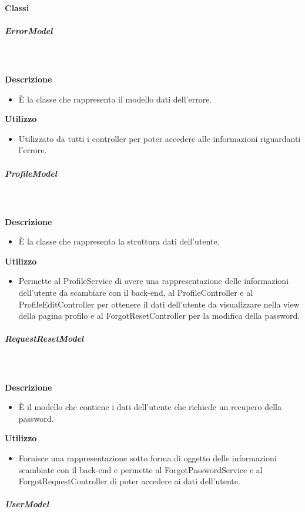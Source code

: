 		\paragraph{Classi}
			\subparagraph{ErrorModel}
				
				\textbf{\\ \\ Descrizione} 
					\begin{itemize}
						\item[] È la classe che rappresenta il modello dati dell'errore.
					\end{itemize}      
				\textbf{Utilizzo}  
					\begin{itemize}
						\item[] Utilizzato da tutti i controller per poter accedere alle informazioni riguardanti l'errore.
					\end{itemize}
			\subparagraph{ProfileModel}
				
				\textbf{\\ \\ Descrizione} 
					\begin{itemize}
						\item[] È la classe che rappresenta la struttura dati dell'utente.
					\end{itemize}      
				\textbf{Utilizzo}  
					\begin{itemize}
						\item[] Permette al ProfileService di avere una rappresentazione delle informazioni dell'utente da scambiare con il back-end, al ProfileController e al ProfileEditController per ottenere il dati dell'utente da visualizzare nella view della pagina profilo e al ForgotResetController per la modifica della password.
					\end{itemize}
			\subparagraph{RequestResetModel}
				
				\textbf{\\ \\ Descrizione} 
					\begin{itemize}
						\item[] È il modello che contiene i dati dell'utente che richiede un recupero della password.
					\end{itemize}      
				\textbf{Utilizzo}  
					\begin{itemize}
						\item[] Fornisce una rappresentazione sotto forma di oggetto delle informazioni scambiate con il back-end e permette al ForgotPasswordService e al ForgotRequestController di poter accedere ai dati dell'utente.
					\end{itemize}
			\subparagraph{UserModel}
				
